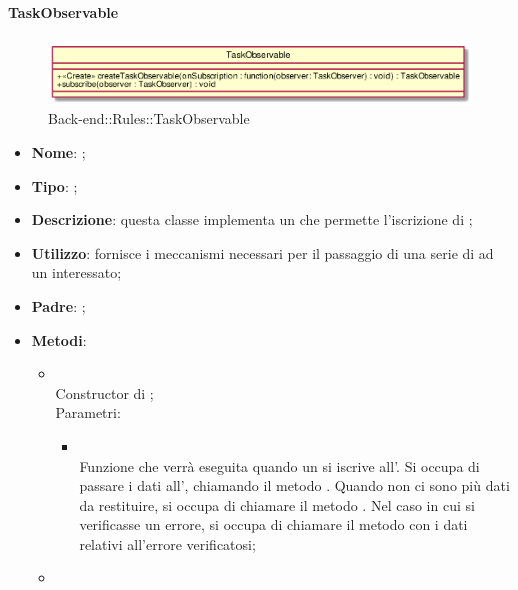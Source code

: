 \hypertarget{TaskObservable_label}{\paragraph{TaskObservable}}
\begin{figure}[h]
	\centering
	\includegraphics[width=\textwidth,height=\textheight,keepaspectratio]{images/ClassTaskObservable.png}
	\caption{Back-end::Rules::TaskObservable}
\end{figure}
\begin{itemize}
	\item \textbf{Nome}: ;
	\item \textbf{Tipo}: ;
	\item \textbf{Descrizione}: questa classe implementa un  che permette l'iscrizione di ;
	\item \textbf{Utilizzo}: fornisce i meccanismi necessari per il passaggio di una serie di  ad un  interessato;
	\item \textbf{Padre}: ;
	\item \textbf{Metodi}:
	\begin{itemize}
		\item[]  \\
		Constructor di ;\\
		Parametri:
		\begin{itemize}
			\item {} \\
			Funzione che verrà eseguita quando un  si iscrive all'. Si occupa di passare i dati all', chiamando il metodo . Quando non ci sono più dati da restituire, si occupa di chiamare il metodo . Nel caso in cui si verificasse un errore, si occupa di chiamare il metodo  con i dati relativi all'errore verificatosi;
		\end{itemize}
		\item[]  \\

\end{itemize}
\end{itemize}

